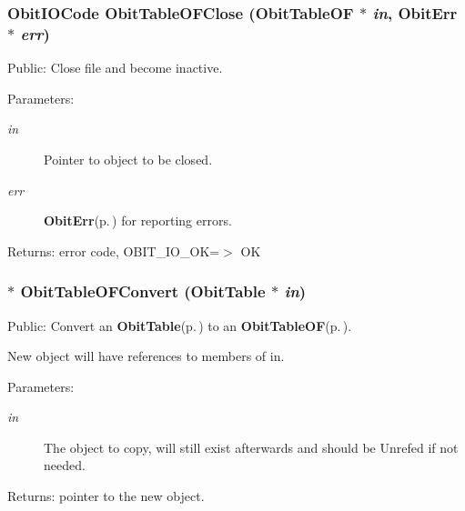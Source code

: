 \subsubsection{\setlength{\rightskip}{0pt plus 5cm}Obit\-IOCode Obit\-Table\-OFClose ({\bf Obit\-Table\-OF} $\ast$ {\em in}, {\bf Obit\-Err} $\ast$ {\em err})}\label{ObitTableOF_8c_a25}


Public: Close file and become inactive. 

\begin{Desc}
\item[Parameters:]
\begin{description}
\item[{\em in}]Pointer to object to be closed. \item[{\em err}]{\bf Obit\-Err}{\rm (p.\,\pageref{structObitErr})} for reporting errors. \end{description}
\end{Desc}
\begin{Desc}
\item[Returns:]error code, OBIT\_\-IO\_\-OK=$>$ OK \end{Desc}
\subsubsection{$\ast$ Obit\-Table\-OFConvert ({\bf Obit\-Table} $\ast$ {\em in})}\label{ObitTableOF_8c_a19}


Public: Convert an {\bf Obit\-Table}{\rm (p.\,\pageref{structObitTable})} to an {\bf Obit\-Table\-OF}{\rm (p.\,\pageref{structObitTableOF})}. 

New object will have references to members of in. \begin{Desc}
\item[Parameters:]
\begin{description}
\item[{\em in}]The object to copy, will still exist afterwards and should be Unrefed if not needed. \end{description}
\end{Desc}
\begin{Desc}
\item[Returns:]pointer to the new object. \end{Desc}
